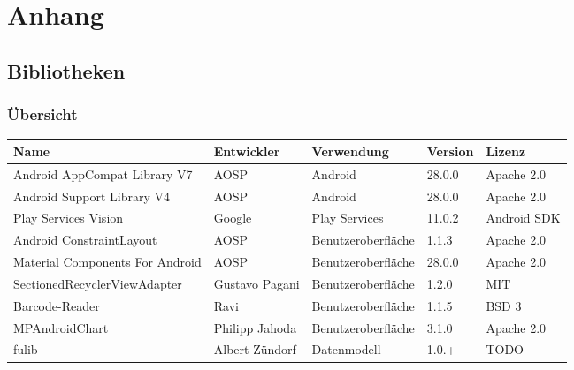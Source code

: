 \section{Anhang}\label{sec:bib}

\subsection{Bibliotheken}\label{subsec:bibliotheken}

\subsubsection{Übersicht} \label{subsubsec:libraries-overview}

\begin{tabularx}{\textwidth}{|X|l|l|l|l|}
    \hline
    \textbf{Name} & \textbf{Entwickler} & \textbf{Verwendung} & \textbf{Version} & \textbf{Lizenz} \\
    [0.5ex] \hline
    Android AppCompat Library V7 & AOSP & Android & 28.0.0 & Apache 2.0\\    %
    Android Support Library V4 & AOSP & Android & 28.0.0 & Apache 2.0\\   %
    \hline

    Play Services Vision & Google & Play Services & 11.0.2 & Android SDK\\  %
    \hline

    Android ConstraintLayout & AOSP & Benutzeroberfläche & 1.1.3 & Apache 2.0\\   %
    Material Components For Android & AOSP & Benutzeroberfläche & 28.0.0 & Apache 2.0\\  %
    SectionedRecyclerViewAdapter & Gustavo Pagani & Benutzeroberfläche & 1.2.0 & MIT\\   %
    Barcode-Reader & Ravi & Benutzeroberfläche & 1.1.5 & BSD 3\\   %
    MPAndroidChart & Philipp Jahoda & Benutzeroberfläche & 3.1.0 & Apache 2.0\\  %
    \hline

    fulib & Albert Zündorf & Datenmodell & 1.0.+ & TODO\\    %
    \hline


\end{tabularx}
